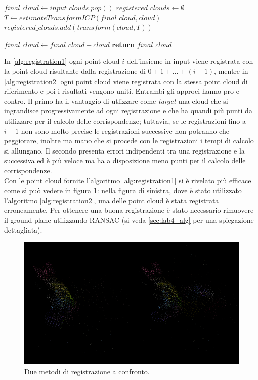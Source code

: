 \documentclass[a4paper]{article}
\begin{document}
	\begin{algorithm}
		\label{alg:registration2}
		\caption{}
		\begin{algorithmic}
				\State $final\_cloud \gets input\_clouds.pop()$	
				\State $registered\_clouds \gets \emptyset$
					\State $T \gets estimateTransformICP(final\_cloud, cloud)$
					\State $registered\_clouds.add(transform(cloud,T))$
				\EndFor
				
					\State $final\_cloud \gets final\_cloud + cloud$
				\EndFor
				\State \textbf{return} $final\_cloud$
			\EndFunction
		\end{algorithmic}
	\end{algorithm}

	In \ref{alg:registration1} ogni point cloud $i$ dell'insieme in input viene registrata con la point cloud risultante dalla registrazione di $0 + 1 + \dots + (i-1)$, mentre in \ref{alg:registration2} ogni point cloud viene registrata con la stessa point cloud di riferimento e poi i risultati vengono uniti. Entrambi gli approci hanno pro e contro. Il primo ha il vantaggio di utlizzare come \textit{target} una cloud che si ingrandisce progressivamente ad ogni registrazione e che ha quandi più punti da utilizzare per il calcolo delle corrispondenze; tuttavia, se le registrazioni fino a $i-1$ non sono molto precise le registrazioni successive non potranno che peggiorare, inoltre ma mano che si procede con le registrazioni i tempi di calcolo si allungano. Il secondo presenta errori indipendenti tra una registrazione e la successiva ed è più veloce ma ha a disposizione meno punti per il calcolo delle corrispondenze.\\
	Con le point cloud fornite l'algoritmo \ref{alg:registration1} si è rivelato più efficace come si può vedere in figura \ref{fig:lab3}: nella figura di sinistra, dove è stato utilizzato l'algoritmo \ref{alg:registration2}, una delle point cloud è stata registrata erroneamente. Per ottenere una buona registrazione è stato necessario rimuovere il ground plane utilizzando RANSAC (si veda \ref{sec:lab4_alg} per una spiegazione dettagliata).
	

	\begin{figure}
		\centering
		\includegraphics[width=1\textwidth]{images/lab3.png}
		\caption{\label{fig:lab3}Due metodi di registrazione a confronto.}
	\end{figure}
\end{document}
